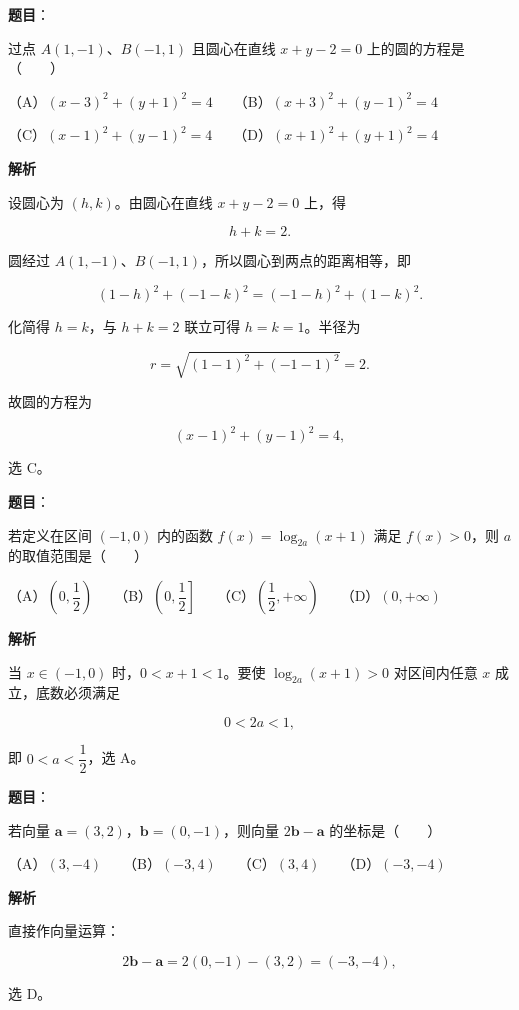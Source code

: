 \begin{answer}

\textbf{题目}：

过点 $A(1,-1)$、$B(-1,1)$ 且圆心在直线 $x+y-2=0$ 上的圆的方程是\mbox{（　　）}

（A）$(x-3)^2+(y+1)^2=4$　　（B）$(x+3)^2+(y-1)^2=4$

（C）$(x-1)^2+(y-1)^2=4$　　（D）$(x+1)^2+(y+1)^2=4$

\textbf{解析}

设圆心为 $(h,k)$。由圆心在直线 $x+y-2=0$ 上，得

\nopagebreak[4]
\[
h+k=2.
\]

圆经过 $A(1,-1)$、$B(-1,1)$，所以圆心到两点的距离相等，即

\nopagebreak[4]
\[
(1-h)^2+(-1-k)^2=(-1-h)^2+(1-k)^2.
\]

化简得 $h=k$，与 $h+k=2$ 联立可得 $h=k=1$。半径为

\nopagebreak[4]
\[
r=\sqrt{(1-1)^2+(-1-1)^2}=2.
\]

故圆的方程为

\nopagebreak[4]
\[
(x-1)^2+(y-1)^2=4,
\]

选 C。


\end{answer}
\begin{answer}

\textbf{题目}：

若定义在区间 $(-1,0)$ 内的函数 $f(x)=\log_{2a}(x+1)$ 满足 $f(x)>0$，则 $a$ 的取值范围是\mbox{（　　）}

（A）$\left(0,\dfrac12\right)$　　（B）$\left(0,\dfrac12\right]$　　（C）$\left(\dfrac12,+\infty\right)$　　（D）$(0,+\infty)$

\textbf{解析}

当 $x\in(-1,0)$ 时，$0<x+1<1$。要使 $\log_{2a}(x+1)>0$ 对区间内任意 $x$ 成立，底数必须满足

\nopagebreak[4]
\[
0<2a<1,
\]

即 $0<a<\dfrac12$，选 A。


\end{answer}
\begin{answer}

\textbf{题目}：

若向量 $\boldsymbol a=(3,2)$，$\boldsymbol b=(0,-1)$，则向量 $2\boldsymbol b-\boldsymbol a$ 的坐标是\mbox{（　　）}

（A）$(3,-4)$　　（B）$(-3,4)$　　（C）$(3,4)$　　（D）$(-3,-4)$

\textbf{解析}

直接作向量运算：

\nopagebreak[4]
\[
2\boldsymbol b-\boldsymbol a
=2(0,-1)-(3,2)=(-3,-4),
\]

选 D。


\end{answer}
